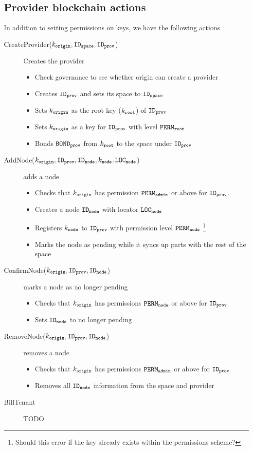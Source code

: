 \documentclass{article}
\begin{document}
\subsection{Provider blockchain actions}
In addition to setting permissions on keys, we have the following actions
\begin{description}
  \item[CreateProvider($k_\mathtt{origin}, \mathtt{ID_{space}}, \mathtt{ID_{prov}}$)] Creates the provider
    \begin{itemize}
      \item Check governance to see whether origin can create a provider
      \item Creates $\mathtt{ID_{prov}}$ and sets its space to $\mathtt{ID_{space}}$
      \item Sets $k_\mathtt{origin}$ as the root key ($k_\mathtt{root}$) of $\mathtt{ID_{prov}}$
      \item Sets $k_\mathtt{origin}$ as a key for $\mathtt{ID_{prov}}$ with level $\mathtt{PERM_{root}}$
      \item Bonds $\mathtt{BOND_{prov}}$ from $k_\mathtt{root}$ to the space under $\mathtt{ID_{prov}}$
    \end{itemize}
  \item[AddNode($k_\mathtt{origin}, \mathtt{ID_{prov}}, \mathtt{ID_{node}}, k_\mathtt{node}, \mathtt{LOC_{node}}$)] adds a node
    \begin{itemize}
      \item Checks that $k_\mathtt{origin}$ has permission $\mathtt{PERM_{admin}}$ or above for $\mathtt{ID_{prov}}$.
      \item Creates a node $\mathtt{ID_{node}}$ with locator $\mathtt{LOC_{node}}$
      \item Registers $k_\mathtt{node}$ to $\mathtt{ID_{prov}}$ with permission level $\mathtt{PERM_{node}}$ \footnote{Should this error if the key already exists within the permissions scheme?}
      \item Marks the node as pending while it syncs up parts with the rest of the space
    \end{itemize}
  \item[ConfirmNode($k_\mathtt{origin}, \mathtt{ID_{prov}}, \mathtt{ID_{node}}$)] marks a node as no longer pending
    \begin{itemize}
      \item Checks that $k_\mathtt{origin}$ has permissions $\mathtt{PERM_{node}}$ or above for $\mathtt{ID_{prov}}$
      \item Sets $\mathtt{ID_{node}}$ to no longer pending
    \end{itemize}
  \item[RemoveNode($k_\mathtt{origin}, \mathtt{ID_{prov}}, \mathtt{ID_{node}}$)] removes a node
    \begin{itemize}
      \item Checks that $k_\mathtt{origin}$ has permissions $\mathtt{PERM_{admin}}$ or above for $\mathtt{ID_{prov}}$
      \item Removes all $\mathtt{ID_{node}}$ information from the space and provider
    \end{itemize}
  \item[BillTenant] TODO
\end{description}
\end{document}
